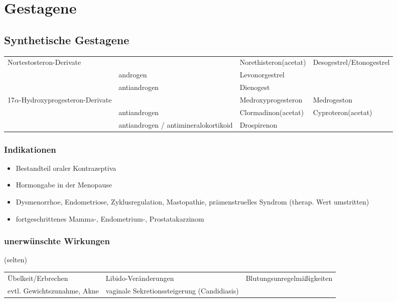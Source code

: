 \documentclass[10pt,a4paper]{report}
\begin{document}
\section{Gestagene} %
\label{sec:gestagene}
\subsection{Synthetische Gestagene} %
\label{sub:synthetische_gestagene}
\begin{tabularx}{\textwidth}{XXXX}
Nortestosteron-Derivate&&Norethisteron(acetat)&Desogestrel/Etonogestrel\\
&androgen&Levonorgestrel&\\
&antiandrogen&Dienogest&\\
17$\alpha$-Hydroxyprogesteron-Derivate&&Medroxyprogesteron&Medrogeston\\
&antiandrogen&Clormadinon(acetat)&Cyproteron(acetat)\\
&antiandrogen / antimineralokortikoid&Drospirenon&\\
\end{tabularx}
\subsubsection{Indikationen} %
\label{subp:indikationen}
\begin{itemize}
	\item Bestandteil oraler Kontrazeptiva  
	\item Hormongabe in der Menopause
	\item Dysmenorrhoe, Endometriose, Zyklusregulation, Mastopathie, prämenstruelles Syndrom (therap. Wert umstritten)
	\item fortgeschrittenes Mamma-, Endometrium-, Prostatakarzinom
\end{itemize}
\subsubsection{unerwünschte Wirkungen} %
\label{par:unerw_nschte_wirkungen}
(selten)\\
\begin{tabularx}{\textwidth}{XXX}
Übelkeit/Erbrechen&Libido-Veränderungen&Blutungsunregelmäßigkeiten\\
evtl. Gewichtszunahme, Akne&vaginale Sekretionssteigerung (Candidiasis)&\\
\end{tabularx}
\end{document}
